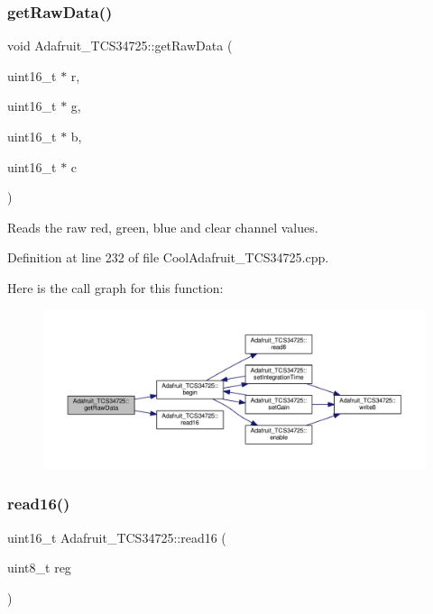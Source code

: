 \subsubsection{\texorpdfstring{get\+Raw\+Data()}{getRawData()}}
{\footnotesize\ttfamily void Adafruit\+\_\+\+T\+C\+S34725\+::get\+Raw\+Data (\begin{DoxyParamCaption}\item[{uint16\+\_\+t $\ast$}]{r,  }\item[{uint16\+\_\+t $\ast$}]{g,  }\item[{uint16\+\_\+t $\ast$}]{b,  }\item[{uint16\+\_\+t $\ast$}]{c }\end{DoxyParamCaption})}



Reads the raw red, green, blue and clear channel values. 



Definition at line 232 of file Cool\+Adafruit\+\_\+\+T\+C\+S34725.\+cpp.

Here is the call graph for this function\+:\nopagebreak
\begin{figure}[H]
\begin{center}
\leavevmode
\includegraphics[width=350pt]{class_adafruit___t_c_s34725_abd9946a9baab1e0c76248cfe1864ea27_cgraph}
\end{center}
\end{figure}
\mbox{\label{class_adafruit___t_c_s34725_a6b9b65ff0f1e57797a1c05a43fd25385}} 
\subsubsection{\texorpdfstring{read16()}{read16()}}
{\footnotesize\ttfamily uint16\+\_\+t Adafruit\+\_\+\+T\+C\+S34725\+::read16 (\begin{DoxyParamCaption}\item[{uint8\+\_\+t}]{reg }\end{DoxyParamCaption})}



